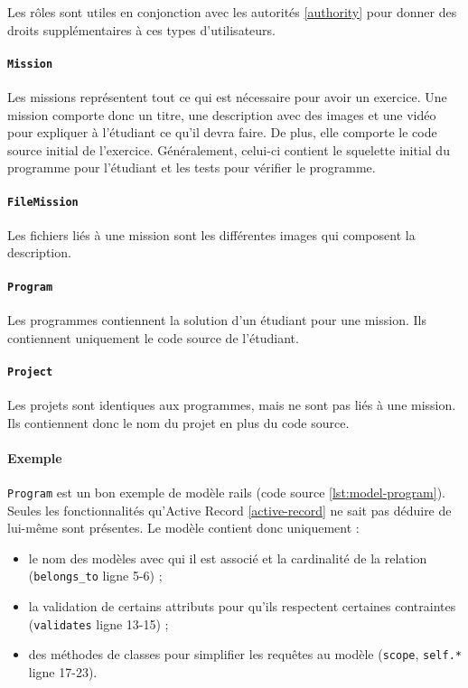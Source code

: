 Les rôles sont utiles en conjonction avec les autorités \ref{authority} pour donner des droits supplémentaires à ces types d'utilisateurs.

\paragraph{\texttt{Mission}} Les missions représentent tout ce qui est nécessaire pour avoir un exercice. Une mission comporte donc un titre, une description avec des images et une vidéo pour expliquer à l'étudiant ce qu'il devra faire. De plus, elle comporte le code source initial de l'exercice. Généralement, celui-ci contient le squelette initial du programme pour l'étudiant et les tests pour vérifier le programme.

\paragraph{\texttt{FileMission}} Les fichiers liés à une mission sont les différentes images qui composent la description.

\paragraph{\texttt{Program}} Les programmes contiennent la solution d'un étudiant pour une mission. Ils contiennent uniquement le code source de l'étudiant.

\paragraph{\texttt{Project}} Les projets sont identiques aux programmes, mais ne sont pas liés à une mission. Ils contiennent donc le nom du projet en plus du code source.

\paragraph{Exemple} \texttt{Program} est un bon exemple de modèle \gls{rails} (code source \ref{lst:model-program}). Seules les fonctionnalités qu’Active Record \ref{active-record} ne sait pas déduire de lui-même sont présentes. Le modèle contient donc uniquement :
\begin{itemize}
  \item le nom des modèles avec qui il est associé et la cardinalité de la relation (\lstinline[language=Rails]{belongs_to} ligne 5-6) ;
  \item la validation de certains attributs pour qu'ils respectent certaines contraintes (\lstinline[language=Rails]{validates} ligne 13-15) ;
  \item des méthodes de classes pour simplifier les requêtes au modèle (\lstinline[language=Rails]{scope},  \lstinline[language=Rails]{self.*} ligne 17-23).
\end{itemize}

